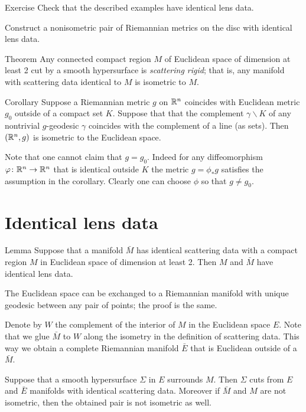 \begin{thm}{Exercise}
Check that the described examples have identical lens data.

Construct a nonisometric pair of Riemannian metrics on the disc with identical lens data.
\end{thm}

\begin{thm}{Theorem}\label{thm:magic-cloak}
Any connected compact region $M$ of Euclidean space of dimension at least 2 cut by a smooth hypersurface is \emph{scattering rigid};
that is, any manifold with scattering data identical to $M$ is isometric to $M$.
\end{thm}

\begin{thm}{Corollary}
Suppose a Riemannian metric $g$ on $\mathbb{R}^n$ coincides with Euclidean metric $g_0$ outside of a compact set $K$.
Suppose that that the complement $\gamma\backslash K$ of any nontrivial $g$-geodesic $\gamma$ coincides with the complement of a line (as sets).
Then $(\mathbb{R}^n,g)$ is isometric to the Euclidean space.
\end{thm}

Note that one cannot claim that $g=g_0$.
Indeed for any diffeomorphism $\varphi\colon\mathbb{R}^n\to\mathbb{R}^n$ that is identical outside $K$ the metric $g=\phi_*g$ satisfies the assumption in the corollary.
Clearly one can choose $\phi$ so that $g\ne g_0$.


\section{Identical lens data}

\begin{thm}{Lemma}\label{lem:no-delay}
Suppose that a manifold $\bar M$ has identical scattering data with a compact region $M$ in Euclidean space of dimension at least 2.
Then $M$ and $\bar M$ have identical lens data. 
\end{thm}

The Euclidean space can be exchanged to a Riemannian manifold with unique geodesic between any pair of points; the proof is the same.

Denote by $W$ the complement of the interior of $M$ in the Euclidean space $E$.
Note that we glue $\bar M$ to $W$ along the isometry in the definition of scattering data.
This way we obtain a complete Riemannian manifold $\bar E$ that is Euclidean outside of a $\bar M$.

Suppose that a smooth hypersurface $\Sigma$ in $E$ surrounds $M$.
Then $\Sigma$ cuts from $E$ and $\bar E$ manifolds with identical scattering data.
Moreover if $\bar M$ and $M$ are not isometric,
then the obtained pair is not isometric as well.

